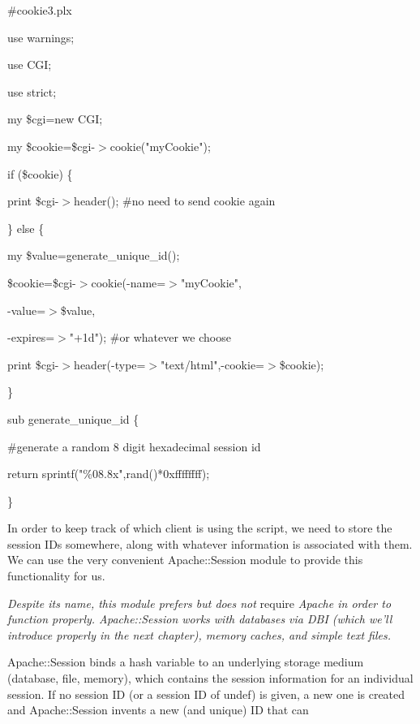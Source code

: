 \documentclass[a4paper,11pt]{book}
\begin{document}
\noindent \#cookie3.plx

\noindent use warnings;

\noindent use CGI;

\noindent use strict;

\noindent 

\noindent my \$cgi=new CGI;

\noindent 

\noindent my \$cookie=\$cgi-$>$cookie("myCookie");

\noindent 

\noindent if (\$cookie) \{

\noindent print \$cgi-$>$header(); \#no need to send cookie again

\noindent \} else \{

\noindent my \$value=generate\_unique\_id();

\noindent \$cookie=\$cgi-$>$cookie(-name=$>$"myCookie",

\noindent -value=$>$\$value,

\noindent -expires=$>$"+1d"); \#or whatever we choose

\noindent print \$cgi-$>$header(-type=$>$"text/html",-cookie=$>$\$cookie);

\noindent \}

\noindent 

\noindent sub generate\_unique\_id \{

\noindent \#generate a random 8 digit hexadecimal session id

\noindent return sprintf("\%08.8x",rand()*0xffffffff);

\noindent \}

\noindent 

\noindent In order to keep track of which client is using the script, we need to store the session IDs somewhere, along with whatever information is associated with them. We can use the very convenient Apache::Session module to provide this functionality for us.

\noindent 

\noindent \textit{Despite its name, this module prefers but does not }require \textit{Apache in order to function properly. Apache::Session works with databases via DBI (which we'll introduce properly in the next chapter), memory caches, and simple text files.}

\noindent 

\noindent 

\noindent Apache::Session binds a hash variable to an underlying storage medium (database, file, memory), which contains the session information for an individual session. If no session ID (or a session ID of undef) is given, a new one is created and Apache::Session invents a new (and unique) ID that can
\end{document}

